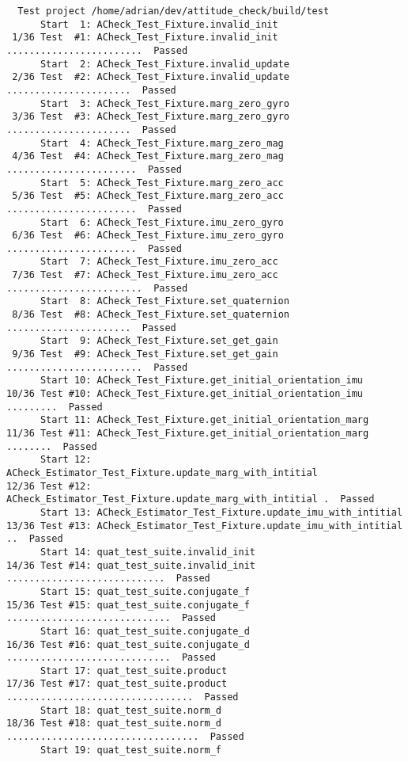 \documentclass[12pt, titlepage]{article}
\begin{document}
\begin{small}
\begin{verbatim}
  Test project /home/adrian/dev/attitude_check/build/test
      Start  1: ACheck_Test_Fixture.invalid_init
 1/36 Test  #1: ACheck_Test_Fixture.invalid_init ........................  Passed
      Start  2: ACheck_Test_Fixture.invalid_update
 2/36 Test  #2: ACheck_Test_Fixture.invalid_update ......................  Passed
      Start  3: ACheck_Test_Fixture.marg_zero_gyro
 3/36 Test  #3: ACheck_Test_Fixture.marg_zero_gyro ......................  Passed
      Start  4: ACheck_Test_Fixture.marg_zero_mag
 4/36 Test  #4: ACheck_Test_Fixture.marg_zero_mag .......................  Passed
      Start  5: ACheck_Test_Fixture.marg_zero_acc
 5/36 Test  #5: ACheck_Test_Fixture.marg_zero_acc .......................  Passed
      Start  6: ACheck_Test_Fixture.imu_zero_gyro
 6/36 Test  #6: ACheck_Test_Fixture.imu_zero_gyro .......................  Passed
      Start  7: ACheck_Test_Fixture.imu_zero_acc
 7/36 Test  #7: ACheck_Test_Fixture.imu_zero_acc ........................  Passed
      Start  8: ACheck_Test_Fixture.set_quaternion
 8/36 Test  #8: ACheck_Test_Fixture.set_quaternion ......................  Passed
      Start  9: ACheck_Test_Fixture.set_get_gain
 9/36 Test  #9: ACheck_Test_Fixture.set_get_gain ........................  Passed
      Start 10: ACheck_Test_Fixture.get_initial_orientation_imu
10/36 Test #10: ACheck_Test_Fixture.get_initial_orientation_imu .........  Passed
      Start 11: ACheck_Test_Fixture.get_initial_orientation_marg
11/36 Test #11: ACheck_Test_Fixture.get_initial_orientation_marg ........  Passed
      Start 12: ACheck_Estimator_Test_Fixture.update_marg_with_intitial
12/36 Test #12: ACheck_Estimator_Test_Fixture.update_marg_with_intitial .  Passed
      Start 13: ACheck_Estimator_Test_Fixture.update_imu_with_intitial
13/36 Test #13: ACheck_Estimator_Test_Fixture.update_imu_with_intitial ..  Passed
      Start 14: quat_test_suite.invalid_init
14/36 Test #14: quat_test_suite.invalid_init ............................  Passed
      Start 15: quat_test_suite.conjugate_f
15/36 Test #15: quat_test_suite.conjugate_f .............................  Passed
      Start 16: quat_test_suite.conjugate_d
16/36 Test #16: quat_test_suite.conjugate_d .............................  Passed
      Start 17: quat_test_suite.product
17/36 Test #17: quat_test_suite.product .................................  Passed
      Start 18: quat_test_suite.norm_d
18/36 Test #18: quat_test_suite.norm_d ..................................  Passed
      Start 19: quat_test_suite.norm_f

\end{verbatim}
\end{small}
\end{document}
